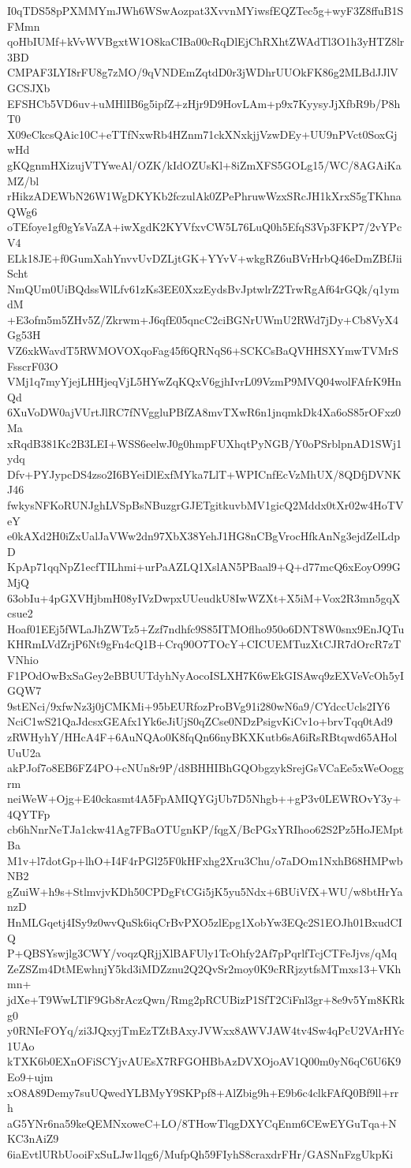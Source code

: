 I0qTDS58pPXMMYmJWh6WSwAozpat3XvvnMYiwsfEQZTec5g+wyF3Z8ffuB1SFMmn
qoHbIUMf+kVvWVBgxtW1O8kaCIBa00cRqDlEjChRXhtZWAdTl3O1h3yHTZ8lr3BD
CMPAF3LYI8rFU8g7zMO/9qVNDEmZqtdD0r3jWDhrUUOkFK86g2MLBdJJlVGCSJXb
EFSHCb5VD6uv+uMHlIB6g5ipfZ+zHjr9D9HovLAm+p9x7KyysyJjXfbR9b/P8hT0
X09eCkcsQAic10C+eTTfNxwRb4HZnm71ckXNxkjjVzwDEy+UU9nPVct0SoxGjwHd
gKQgnmHXizujVTYweAl/OZK/kIdOZUsKl+8iZmXFS5GOLg15/WC/8AGAiKaMZ/bl
rHikzADEWbN26W1WgDKYKb2fczulAk0ZPePhruwWzxSRcJH1kXrxS5gTKhnaQWg6
oTEfoye1gf0gYsVaZA+iwXgdK2KYVfxvCW5L76LuQ0h5EfqS3Vp3FKP7/2vYPcV4
ELk18JE+f0GumXahYnvvUvDZLjtGK+YYvV+wkgRZ6uBVrHrbQ46eDmZBfJiiScht
NmQUm0UiBQdssWlLfv61zKs3EE0XxzEydsBvJptwlrZ2TrwRgAf64rGQk/q1ymdM
+E3ofm5m5ZHv5Z/Zkrwm+J6qfE05qncC2ciBGNrUWmU2RWd7jDy+Cb8VyX4Gg53H
VZ6xkWavdT5RWMOVOXqoFag45f6QRNqS6+SCKCsBaQVHHSXYmwTVMrSFsscrF03O
VMj1q7myYjejLHHjeqVjL5HYwZqKQxV6gjhIvrL09VzmP9MVQ04wolFAfrK9HnQd
6XuVoDW0ajVUrtJlRC7fNVggluPBfZA8mvTXwR6n1jnqmkDk4Xa6oS85rOFxz0Ma
xRqdB381Kc2B3LEI+WSS6eelwJ0g0hmpFUXhqtPyNGB/Y0oPSrblpnAD1SWj1ydq
Dfv+PYJypcDS4zso2I6BYeiDlExfMYka7LlT+WPICnfEcVzMhUX/8QDfjDVNKJ46
fwkysNFKoRUNJghLVSpBsNBuzgrGJETgitkuvbMV1gicQ2Mddx0tXr02w4HoTVeY
e0kAXd2H0iZxUalJaVWw2dn97XbX38YehJ1HG8nCBgVrocHfkAnNg3ejdZelLdpD
KpAp71qqNpZ1ecfTILhmi+urPaAZLQ1XslAN5PBaal9+Q+d77mcQ6xEoyO99GMjQ
63obIu+4pGXVHjbmH08yIVzDwpxUUeudkU8IwWZXt+X5iM+Vox2R3mn5gqXcsue2
Hoaf01EEj5fWLaJhZWTz5+Zzf7ndhfc9S85ITMOflho950o6DNT8W0snx9EnJQTu
KHRmLVdZrjP6Nt9gFn4cQ1B+Crq90O7TOcY+CICUEMTuzXtCJR7dOrcR7zTVNhio
F1POdOwBxSaGey2eBBUUTdyhNyAocoISLXH7K6wEkGISAwq9zEXVeVcOh5yIGQW7
9stENci/9xfwNz3j0jCMKMi+95bEURfozProBVg91i280wN6a9/CYdccUcls2IY6
NciC1wS21QaJdcsxGEAfx1Yk6eJiUjS0qZCse0NDzPsigvKiCv1o+brvTqq0tAd9
zRWHyhY/HHcA4F+6AuNQAo0K8fqQn66nyBKXKutb6sA6iRsRBtqwd65AHolUuU2a
akPJof7o8EB6FZ4PO+cNUn8r9P/d8BHHIBhGQObgzykSrejGsVCaEe5xWeOoggrm
neiWeW+Ojg+E40ckasmt4A5FpAMIQYGjUb7D5Nhgb++gP3v0LEWROvY3y+4QYTFp
cb6hNnrNeTJa1ckw41Ag7FBaOTUgnKP/fqgX/BcPGxYRIhoo62S2Pz5HoJEMptBa
M1v+l7dotGp+lhO+I4F4rPGl25F0kHFxhg2Xru3Chu/o7aDOm1NxhB68HMPwbNB2
gZuiW+h9s+StlmvjvKDh50CPDgFtCGi5jK5yu5Ndx+6BUiVfX+WU/w8btHrYanzD
HnMLGqetj4ISy9z0wvQuSk6iqCrBvPXO5zlEpg1XobYw3EQc2S1EOJh01BxudCIQ
P+QBSYswjlg3CWY/voqzQRjjXlBAFUly1TcOhfy2Af7pPqrlfTcjCTFeJjvs/qMq
ZeZSZm4DtMEwhnjY5kd3iMDZznu2Q2QvSr2moy0K9cRRjzytfsMTmxs13+VKhmn+
jdXe+T9WwLTlF9Gb8rAczQwn/Rmg2pRCUBizP1SfT2CiFnl3gr+8e9v5Ym8KRkg0
y0RNIeFOYq/zi3JQxyjTmEzTZtBAxyJVWxx8AWVJAW4tv4Sw4qPcU2VArHYc1UAo
kTXK6b0EXnOFiSCYjvAUEsX7RFGOHBbAzDVXOjoAV1Q00m0yN6qC6U6K9Eo9+ujm
xO8A89Demy7suUQwedYLBMyY9SKPpf8+AlZbig9h+E9b6c4clkFAfQ0Bf9ll+rrh
aG5YNr6na59keQEMNxoweC+LO/8THowTlqgDXYCqEnm6CEwEYGuTqa+NKC3nAiZ9
6iaEvtlURbUooiFxSuLJw1lqg6/MufpQh59FIyhS8craxdrFHr/GASNnFzgUkpKi
